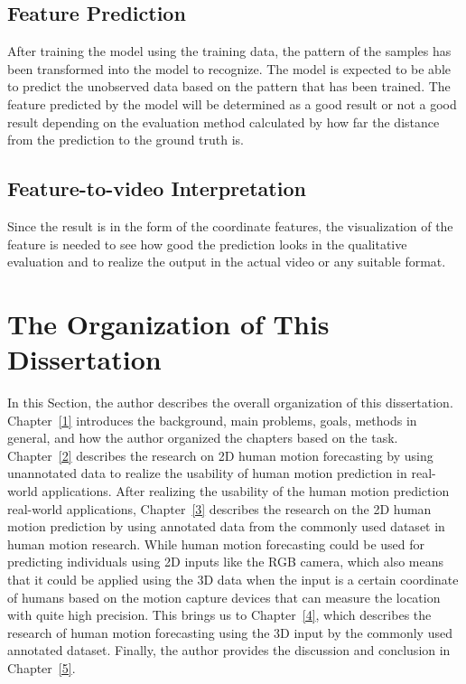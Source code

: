 \subsection{Feature Prediction}
After training the model using the training data, the pattern of the samples has been transformed into the model to recognize. The model is expected to be able to predict the unobserved data based on the pattern that has been trained. The feature predicted by the model will be determined as a good result or not a good result depending on the evaluation method calculated by how far the distance from the prediction to the ground truth is.

\subsection{Feature-to-video Interpretation}
Since the result is in the form of the coordinate features, the visualization of the feature is needed to see how good the prediction looks in the qualitative evaluation and to realize the output in the actual video or any suitable format.

\section{The Organization of This Dissertation}\label{1:organization} %
In this Section, the author describes the overall organization of this dissertation. Chapter~\ref{1} introduces the background, main problems, goals, methods in general, and how the author organized the chapters based on the task. Chapter~\ref{2} describes the research on 2D human motion forecasting by using unannotated data to realize the usability of human motion prediction in real-world applications. After realizing the usability of the human motion prediction real-world applications, Chapter~\ref{3} describes the research on the 2D human motion prediction by using annotated data from the commonly used dataset in human motion research. While human motion forecasting could be used for predicting individuals using 2D inputs like the RGB camera, which also means that it could be applied using the 3D data when the input is a certain coordinate of humans based on the motion capture devices that can measure the location with quite high precision. This brings us to Chapter~\ref{4}, which describes the research of human motion forecasting using the 3D input by the commonly used annotated dataset. Finally, the author provides the discussion and conclusion in Chapter~\ref{5}.


